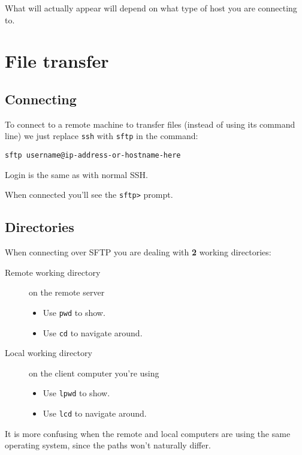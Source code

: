 \documentclass[slides]{pgnotes}
\begin{document}
What will actually appear will depend on what type of host you are connecting to.


\section{File transfer}

\subsection{Connecting}

To connect to a remote machine to transfer files (instead of using its command line) we just replace \texttt{ssh} with \texttt{sftp} in the command:

\begin{verbatim}
sftp username@ip-address-or-hostname-here
\end{verbatim}

Login is the same as with normal SSH.

When connected you'll see the \texttt{sftp>} prompt.


\subsection{Directories}

When connecting over SFTP you are dealing with \textbf{2} working directories:
\begin{description}
\item[Remote working directory ] on the remote server
  \begin{itemize}
  \item Use \texttt{pwd} to show.
  \item Use \texttt{cd} to navigate around.
  \end{itemize}
\item[Local working directory] on the client computer you're using
  \begin{itemize}
  \item Use \texttt{lpwd} to show.
  \item Use \texttt{lcd} to navigate around.
  \end{itemize}
\end{description}
It is more confusing when the remote and local computers are using the same operating system, since the paths won't naturally differ.
\end{document}

